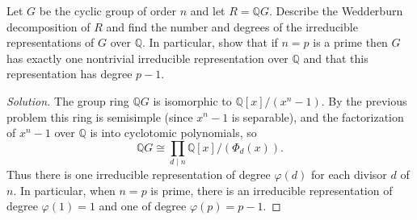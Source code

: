 \documentclass[10pt]{article}
\providecommand{\QQ}{\mathbb Q}
\newenvironment{soln}{\begin{proof}[Solution]}{\end{proof}}
\begin{document}
\begin{problem}
    [\S18.3\#13]
    Let $G$ be the cyclic group of order $n$ and let $R = \QQ G$.
    Describe the Wedderburn decomposition of $R$
    and find the number and degrees of the irreducible representations
    of $G$ over $\QQ$. In particular, show that if $n = p$ is a prime
    then $G$ has exactly one nontrivial irreducible representation
    over $\QQ$ and that this representation has degree $p-1$.
\end{problem}

\begin{soln}
    The group ring $\QQ G$ is isomorphic to $\QQ[x]/(x^n - 1)$.
    By the previous problem this ring is semisimple
    (since $x^n - 1$ is separable), and
    the factorization of $x^n - 1$ over $\QQ$
    is into cyclotomic polynomials, so
    \begin{equation*}
	\QQ G \cong \prod_{d\mid n} \QQ[x]/(\Phi_d(x)).
    \end{equation*}
    Thus there is one irreducible representation
    of degree $\varphi(d)$ for each divisor $d$ of $n$.
    In particular, when $n = p$ is prime,
    there is an irreducible representation of degree $\varphi(1) = 1$
    and one of degree $\varphi(p) = p-1$.
\end{soln}
\end{document}

